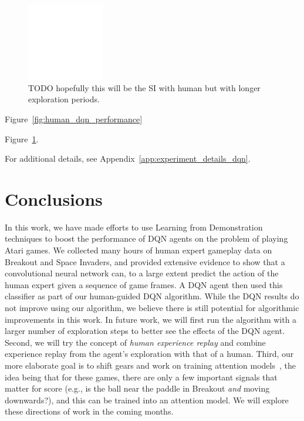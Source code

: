 \documentclass[letterpaper, 10pt, conference]{ieeeconf}
\begin{document}
\begin{figure}[t]
\centering
\includegraphics[width=0.30\textwidth]{figures/empty.png}
\caption{\footnotesize
TODO hopefully this will be the SI with human but with longer exploration
periods.
}
\label{fig:sp_inv_longer_exploration}
\end{figure}

Figure~\ref{fig:human_dqn_performance}

Figure~\ref{fig:sp_inv_longer_exploration}.

For additional details, see Appendix~\ref{app:experiment_details_dqn}.


\section{Conclusions}\label{sec:conclusions}

In this work, we have made efforts to use Learning from Demonstration techniques
to boost the performance of DQN agents on the problem of playing Atari games. We
collected many hours of human expert gameplay data on Breakout and Space
Invaders, and provided extensive evidence to show that a convolutional
neural network can, to a large extent predict the action of the human expert
given a sequence of game frames. A DQN agent then used this classifier as part
of our human-guided DQN algorithm. While the DQN results do not improve using
our algorithm, we believe there is still potential for algorithmic improvements
in this work. In future work, we will first run the algorithm with a larger
number of exploration steps to better see the effects of the DQN agent.  Second,
we will try the concept of \emph{human experience replay} and combine experience
replay from the agent's exploration with that of a human. Third, our more
elaborate goal is to shift gears and work on training attention
models~\cite{NIPS2014_5542,icml2015_xuc15}, the idea being that for these games,
there are only a few important signals that matter for score (e.g., is the ball
near the paddle in Breakout \emph{and} moving downwards?), and this can be
trained into an attention model. We will explore these directions of work in the
coming months.
\end{document}
